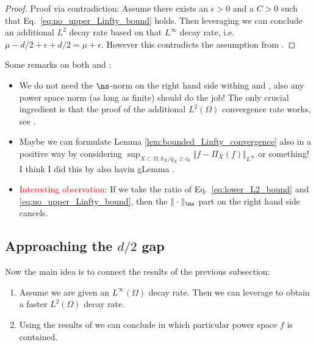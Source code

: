 \documentclass[a4paper, 10pt]{article}
\begin{document}
\begin{proof}
Proof via contradiction:
Assume there exists an $\epsilon > 0$ and a $C > 0$ such that Eq.\ \eqref{eq:no_upper_Linfty_bound} holds.
Then leveraging  we can conclude an additional $L^2$ decay rate based on that $L^\infty$ decay rate, i.e.\ $\mu - d/2 + \epsilon + d/2 = \mu + \epsilon$.
However this contradicts the assumption from .
\end{proof}

Some remarks on both  and :
\begin{itemize}
\item We do not need the $\ns$-norm on the right hand side withing  and , also any power space norm (as long as finite) should do the job! 
The only crucial ingredient is that the proof of the additional $L^2(\Omega)$ convergence rate works, see \cite{wendland1999meshless}.
\item Maybe we can formulate Lemma \ref{lem:bounded_Linfty_convergence} also in a positive way by considering $\sup_{X \subset \Omega, h_X / q_X \geq c_0} \Vert f - \Pi_X(f) \Vert_{L^\infty}$ or something!
I think I did this by also havin gLemma .
\item \textcolor{red}{Interesting observation:}
If we take the ratio of Eq.\ \eqref{eq:lower_L2_bound} and \eqref{eq:no_upper_Linfty_bound}, then the $\Vert \cdot \Vert_{\ns}$ part on the right hand side cancels.
\end{itemize}



\subsection{Approaching the $d/2$ gap}

Now the main idea is to connect the results of the previous subsection:
\begin{enumerate}
\item Assume we are given an $L^\infty(\Omega)$ decay rate.
Then we can leverage  to obtain a faster $L^2(\Omega)$ decay rate. 
\item Using the results of  we can conclude in which particular power space $f$ is contained.
\end{enumerate}
\end{document}
